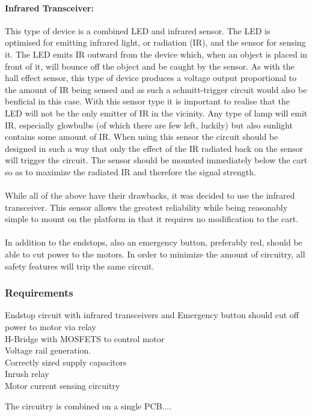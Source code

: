 \paragraph{Infrared Transceiver:} %
\label{par:infrared_transceiver}
This type of device is a combined LED and infrared sensor.
The LED is optimised for emitting infrared light, or radiation (IR), and the sensor for sensing it.
The LED emits IR outward from the device which, when an object is placed in front of it, will bounce off the object and be caught by the sensor.
As with the hall effect sensor, this type of device produces a voltage output proportional to the amount of IR being sensed and as such a schmitt-trigger circuit would also be benficial in this case.
With this sensor type it is important to realise that the LED will not be the only emitter of IR in the vicinity.
Any type of lamp will emit IR, especially glowbulbs (of which there are few left, luckily) but also sunlight contains some amount of IR.
When using this sensor the circuit should be designed in such a way that only the effect of the IR radiated back on the sensor will trigger the circuit.
The sensor should be mounted immediately below the cart so as to maximize the radiated IR and therefore the signal strength.
\\~\\
While all of the above have their drawbacks, it was decided to use the infrared transceiver.
This sensor allows the greatest reliability while being reasonably simple to mount on the platform in that it requires no modification to the cart.
\\~\\
In addition to the endstops, also an emergency button, preferably red, should be able to cut power to the motors.
In order to minimize the amount of circuitry, all safety features will trip the same circuit.



\subsubsection{Requirements}

Endstop circuit with infrared transceivers and Emergency button should cut off power to motor via relay
\\
H-Bridge with MOSFETS to control motor
\\
Voltage rail generation.
\\
Correctly sized supply capacitors
\\
Inrush relay
\\
Motor current sensing circuitry


The circuitry is combined on a single PCB....